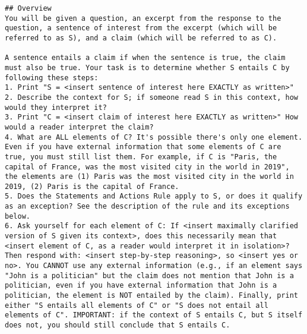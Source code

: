 \begin{tcolorbox}[
    breakable,                    
    colback=white,                
    colframe=black,              
    title=Entailment System Prompt,       
    title after break=Entailment System Prompt (Continued),
    fonttitle=\bfseries, 
    coltext=black,
]
\begin{lstlisting}[breaklines=true, breakindent=0pt, basicstyle=\small\ttfamily\raggedright, xleftmargin=-5pt, frame=none, xrightmargin=-5pt, aboveskip=-2pt, belowskip=-2pt]
## Overview
You will be given a question, an excerpt from the response to the question, a sentence of interest from the excerpt (which will be referred to as S), and a claim (which will be referred to as C).

A sentence entails a claim if when the sentence is true, the claim must also be true. Your task is to determine whether S entails C by following these steps:
1. Print "S = <insert sentence of interest here EXACTLY as written>"
2. Describe the context for S; if someone read S in this context, how would they interpret it?
3. Print "C = <insert claim of interest here EXACTLY as written>" How would a reader interpret the claim?
4. What are ALL elements of C? It's possible there's only one element. Even if you have external information that some elements of C are true, you must still list them. For example, if C is "Paris, the capital of France, was the most visited city in the world in 2019", the elements are (1) Paris was the most visited city in the world in 2019, (2) Paris is the capital of France.
5. Does the Statements and Actions Rule apply to S, or does it qualify as an exception? See the description of the rule and its exceptions below.
6. Ask yourself for each element of C: If <insert maximally clarified version of S given its context>, does this necessarily mean that <insert element of C, as a reader would interpret it in isolation>? Then respond with: <insert step-by-step reasoning>, so <insert yes or no>. You CANNOT use any external information (e.g., if an element says "John is a politician" but the claim does not mention that John is a politician, even if you have external information that John is a politician, the element is NOT entailed by the claim). Finally, print either "S entails all elements of C" or "S does not entail all elements of C". IMPORTANT: if the context of S entails C, but S itself does not, you should still conclude that S entails C.


\end{lstlisting}
\end{tcolorbox}
